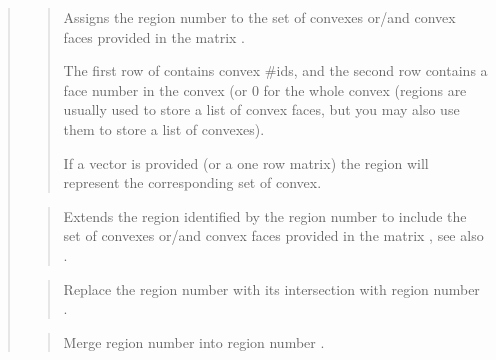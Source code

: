 \documentclass[a4paper,11pt,english]{sphinxmanual}
\begin{document}
\begin{quote}
\sphinxAtStartPar
{}
\begin{quote}

\sphinxAtStartPar
Assigns the region number  to the set of convexes or/and convex
faces provided in the matrix .

\sphinxAtStartPar
The first row of  contains convex \#ids, and the second row
contains a face number in the convex (or 0
for the whole convex (regions are usually used to store a list of
convex faces, but you may also use them to store a list of convexes).

\sphinxAtStartPar
If a vector is provided (or a one row matrix) the region will represent
the corresponding set of convex.
\end{quote}

\sphinxAtStartPar
{}
\begin{quote}

\sphinxAtStartPar
Extends the region identified by the region number  to include
the set of convexes or/and convex faces provided in the matrix
, see also .
\end{quote}

\sphinxAtStartPar
{}
\begin{quote}

\sphinxAtStartPar
Replace the region number  with its intersection with region number .
\end{quote}

\sphinxAtStartPar
{}
\begin{quote}

\sphinxAtStartPar
Merge region number  into region number .
\end{quote}

\sphinxAtStartPar
{}
\begin{quote}


\end{quote}
\end{quote}
\end{document}
